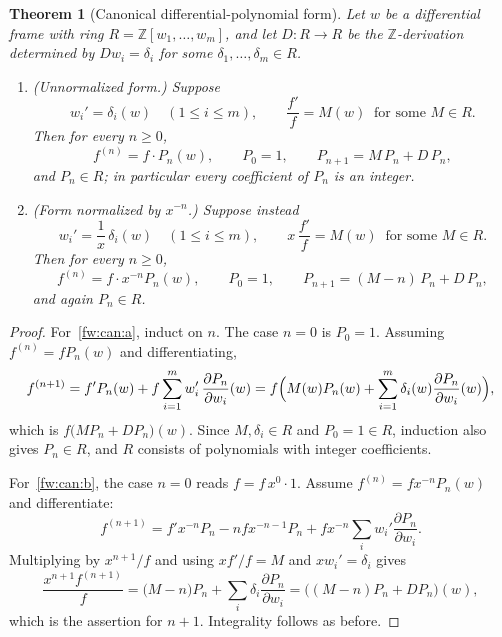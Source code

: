 \documentclass[11pt,a4paper]{article}
\numberwithin{equation}{section}
\newtheorem{theorem}{Theorem}[section]
\theoremstyle{definition}
\theoremstyle{remark}
\theoremstyle{plain}
\newcommand{\Z}{\mathbb Z}
\begin{document}
\begin{theorem}[Canonical differential-polynomial form]\label{fw:thm:canonical}
Let $w$ be a differential frame with ring $R=\Z[w_1,\dots,w_m]$, and let
$D\colon R\to R$ be the $\Z$-derivation determined by $Dw_i=\delta_i$ for some
$\delta_1,\dots,\delta_m\in R$.
\begin{enumerate}[label=\textup{(\alph*)}]
\item\label{fw:can:a}
 \textup{(Unnormalized form.)}  Suppose
 \[
  w_i'=\delta_i(w)\quad(1\le i\le m),
  \qquad \frac{f'}{f}=M(w)\ \text{ for some }M\in R .
 \]
 Then for every $n\ge0$,
 \begin{equation}\label{fw:eq:cana}
  f^{(n)}=f\cdot P_n(w),\qquad
  P_0=1,\qquad P_{n+1}=M\,P_n+D\,P_n ,
 \end{equation}
 and $P_n\in R$; in particular every coefficient of $P_n$ is an integer.
\item\label{fw:can:b}
 \textup{(Form normalized by $x^{-n}$.)}  Suppose instead
 \[
  w_i'=\frac1x\,\delta_i(w)\quad(1\le i\le m),
  \qquad x\,\frac{f'}{f}=M(w)\ \text{ for some }M\in R .
 \]
 Then for every $n\ge0$,
 \begin{equation}\label{fw:eq:canb}
  f^{(n)}=f\cdot x^{-n}P_n(w),\qquad
  P_0=1,\qquad P_{n+1}=(M-n)\,P_n+D\,P_n ,
 \end{equation}
 and again $P_n\in R$.
\end{enumerate}
\end{theorem}

\begin{proof}
For~\ref{fw:can:a}, induct on $n$.  The case $n=0$ is $P_0=1$.  Assuming
$f^{(n)}=fP_n(w)$ and differentiating,
\[
 f^{(n+1)}
 =f'P_n(w)+f\sum_{i=1}^m w_i'\,\frac{\partial P_n}{\partial w_i}(w)
 =f\Bigl(M(w)P_n(w)+\sum_{i=1}^m\delta_i(w)\frac{\partial P_n}{\partial w_i}(w)\Bigr),
\]
which is $f\bigl(MP_n+DP_n\bigr)(w)$.  Since $M,\delta_i\in R$ and $P_0=1\in R$,
induction also gives $P_n\in R$, and $R$ consists of polynomials with integer
coefficients.

For~\ref{fw:can:b}, the case $n=0$ reads $f=f\,x^{0}\cdot1$.  Assume
$f^{(n)}=fx^{-n}P_n(w)$ and differentiate:
\[
 f^{(n+1)}
 =f'x^{-n}P_n-nfx^{-n-1}P_n+fx^{-n}\sum_i w_i'\frac{\partial P_n}{\partial w_i}.
\]
Multiplying by $x^{n+1}/f$ and using $xf'/f=M$ and $xw_i'=\delta_i$ gives
\[
 \frac{x^{n+1}f^{(n+1)}}{f}=\bigl(M-n\bigr)P_n+\sum_i\delta_i\frac{\partial P_n}{\partial w_i}
 =\bigl((M-n)P_n+DP_n\bigr)(w),
\]
which is the assertion for $n+1$.  Integrality follows as before.
\end{proof}
\end{document}

